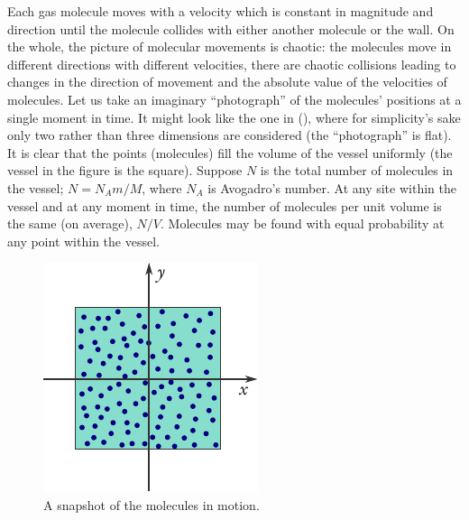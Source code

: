Each gas molecule moves with a velocity which is constant in magnitude and direction until the molecule collides with either another molecule or the wall. On the whole, the picture of molecular movements is chaotic: the molecules move in different directions with different velocities, there are chaotic collisions leading to changes in the direction of movement and the absolute value of the velocities of molecules. Let us take an imaginary ``photograph'' of the molecules' positions at a single moment in time. It might look like the one in (), where for simplicity's sake only two rather than three dimensions are considered (the ``photograph'' is flat). It is clear that the points (molecules) fill the volume of the vessel uniformly (the vessel in the figure is the square). Suppose $N$ is the total number of molecules in the vessel; $N=N_{A}m /M$, where $N_{A}$ is Avogadro's number. At any site within the vessel and at any moment in time, the number of molecules per unit volume is the same (on average), $N/V$. Molecules may be found with equal probability at any point within the vessel.
\begin{figure}
\centering
\includegraphics[width=0.95\linewidth]{figures/mol-photo.pdf}
\caption{A snapshot of the molecules in motion.\label{mol-photo}}
\end{figure}

